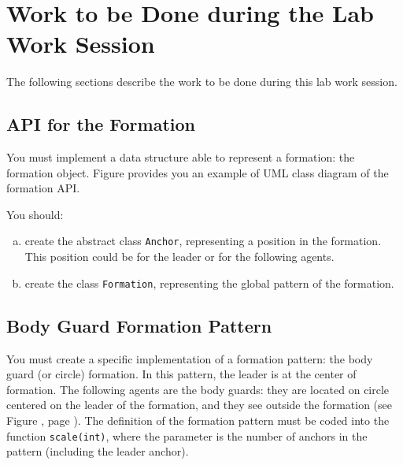 \documentclass[article,english,nodocumentinfo]{multiagentfrreport}
\begin{document}
\section{Work to be Done during the Lab Work Session}

The following sections describe the work to be done during this lab work session.

\subsection{API for the Formation}

You must implement a data structure able to represent a formation: the formation object.
Figure  provides you an example of UML class diagram of the formation API.


You should:
\begin{enumerate}[a)]
\item create the abstract class \texttt{Anchor}, representing a position in the formation. This position could be for the leader or for the following agents.
\item create the class \texttt{Formation}, representing the global pattern of the formation.
\end{enumerate}

\subsection{Body Guard Formation Pattern}

You must create a specific implementation of a formation pattern: the body guard (or circle) formation.
In this pattern, the leader is at the center of formation.
The following agents are the body guards: they are located on circle centered on the leader of the formation, and they see outside the formation (see Figure , page ).
The definition of the formation pattern must be coded into the function \texttt{scale(int)}, where the parameter is the number of anchors in the pattern (including the leader anchor).

\end{document}
